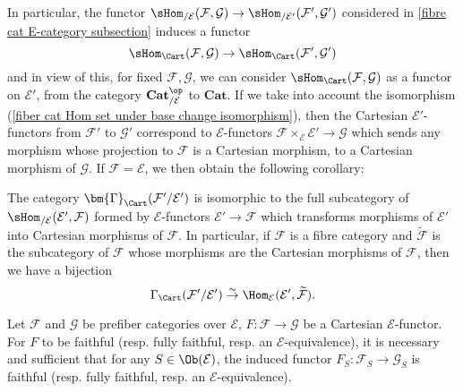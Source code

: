 In particular, the functor $\sHom_{/\mathcal{E}}(\mathcal{F},\mathcal{G})\to \sHom_{/\mathcal{E}'}(\mathcal{F}',\mathcal{G}')$ considered in \cref{fibre cat E-category subsection} induces a functor
\[\sHom_{\Cart}(\mathcal{F},\mathcal{G})\to \sHom_{\Cart}(\mathcal{F}',\mathcal{G}')\]
and in view of this, for fixed $\mathcal{F},\mathcal{G}$, we can consider $\sHom_{\Cart}(\mathcal{F},\mathcal{G})$ as a functor on $\mathcal{E}'$, from the category $\mathbf{Cat}_{/\mathcal{E}}^{\op}$ to $\mathbf{Cat}$. If we take into account the isomorphism (\ref{fiber cat Hom set under base change isomorphism}), then the Cartesian $\mathcal{E}'$-functors from $\mathcal{F}'$ to $\mathcal{G}'$ correspond to $\mathcal{E}$-functors $\mathcal{F}\times_\mathcal{E}\mathcal{E}'\to \mathcal{G}$ which sends any morphism whose projection to $\mathcal{F}$ is a Cartesian morphism, to a Cartesian morphism of $\mathcal{G}$. If $\mathcal{F}=\mathcal{E}$, we then obtain the following corollary:
\begin{corollary}\label{fibre cat Cartesian section of base change bijection}
The category $\bm{\Gamma}_{\Cart}(\mathcal{F}'/\mathcal{E}')$ is isomorphic to the full subcategory of $\sHom_{/\mathcal{E}}(\mathcal{E}',\mathcal{F})$ formed by $\mathcal{E}$-functors $\mathcal{E}'\to \mathcal{F}$ which transforms morphisms of $\mathcal{E}'$ into Cartesian morphisms of $\mathcal{F}$. In particular, if $\mathcal{F}$ is a fibre category and $\widetilde{\mathcal{F}}$ is the subcategory of $\mathcal{F}$ whose morphisms are the Cartesian morphisms of $\mathcal{F}$, then we have a bijection
\[\Gamma_{\Cart}(\mathcal{F}'/\mathcal{E}')\stackrel{\sim}{\to }\Hom_{\mathcal{E}}(\mathcal{E}',\widetilde{\mathcal{F}}).\] 
\end{corollary}
\begin{proposition}\label{fibre cat E-functor fully faithful iff fiber}
Let $\mathcal{F}$ and $\mathcal{G}$ be prefiber categories over $\mathcal{E}$, $F:\mathcal{F}\to \mathcal{G}$ be a Cartesian $\mathcal{E}$-functor. For $F$ to be faithful (resp. fully faithful, resp. an $\mathcal{E}$-equivalence), it is necessary and sufficient that for any $S\in\Ob(\mathcal{E})$, the induced functor $F_S:\mathcal{F}_S\to \mathcal{G}_S$ is faithful (resp. fully faithful, resp. an $\mathcal{E}$-equivalence).
\end{proposition}
